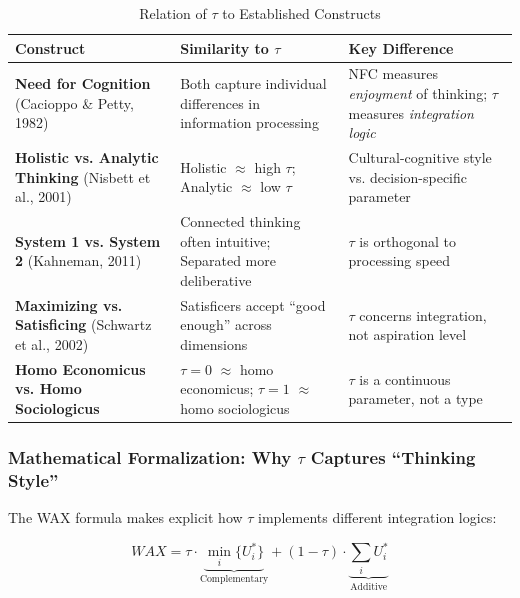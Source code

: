 \begin{table}[htbp]
\centering
\caption{Relation of $\tau$ to Established Constructs}
\label{tab:tau-constructs}
\begin{tabular}{p{3.5cm}p{4cm}p{5cm}}
\toprule
\textbf{Construct} & \textbf{Similarity to $\tau$} & \textbf{Key Difference} \\
\midrule
\textbf{Need for Cognition}
\newline (Cacioppo \& Petty, 1982) 
& Both capture individual differences in information processing 
& NFC measures \textit{enjoyment} of thinking; $\tau$ measures \textit{integration logic} \\[8pt]

\textbf{Holistic vs. Analytic Thinking}
\newline (Nisbett et al., 2001)
& Holistic $\approx$ high $\tau$; Analytic $\approx$ low $\tau$
& Cultural-cognitive style vs. decision-specific parameter \\[8pt]

\textbf{System 1 vs. System 2}
\newline (Kahneman, 2011)
& Connected thinking often intuitive; Separated more deliberative
& $\tau$ is orthogonal to processing speed \\[8pt]

\textbf{Maximizing vs. Satisficing}
\newline (Schwartz et al., 2002)
& Satisficers accept ``good enough'' across dimensions
& $\tau$ concerns integration, not aspiration level \\[8pt]

\textbf{Homo Economicus vs. Homo Sociologicus}
& $\tau=0$ $\approx$ homo economicus; $\tau=1$ $\approx$ homo sociologicus
& $\tau$ is a continuous parameter, not a type \\
\bottomrule
\end{tabular}
\end{table}

\subsubsection{Mathematical Formalization: Why $\tau$ Captures ``Thinking Style''}

The WAX formula makes explicit how $\tau$ implements different integration logics:

\begin{equation}
WAX = \tau \cdot \underbrace{\min_i\{U_i^*\}}_{\text{Complementary}} + (1-\tau) \cdot \underbrace{\sum_i U_i^*}_{\text{Additive}}
\end{equation}

